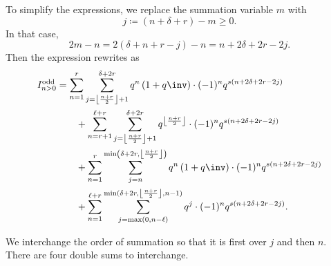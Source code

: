 To simplify the expressions, we replace the summation variable $m$ with
\[ j \coloneqq (n + \delta + r) - m \geq 0. \]
In that case,
\[ 2m-n = 2(\delta+n+r-j)-n = n + 2\delta + 2r - 2j. \]
Then the expression rewrites as
\begin{align*}
  I_{n > 0}^{\text{odd}}
  &= \sum_{n=1}^{r}
    \sum_{j = \left\lfloor \frac{n+r}{2} \right\rfloor+ 1}^{\delta + 2r}
    q^{n} \left( 1 + q\inv \right) \cdot (-1)^n q^{s(n+2\delta+2r-2j)} \\
  &\qquad+ \sum_{n=r+1}^{\ell+r}
    \sum_{j = \left\lfloor \frac{n+r}{2} \right\rfloor+ 1}^{\delta + 2r}
    q^{\left\lfloor \frac{n+r}{2} \right\rfloor} \cdot (-1)^n q^{s(n+2\delta+2r-2j)} \\
  &\qquad+ \sum_{n=1}^{r}
    \sum_{j=n}^{\min\left( \delta+2r, \left\lfloor \frac{n+r}{2} \right\rfloor \right)}
    q^{n} \left( 1 + q\inv \right) \cdot (-1)^n q^{s(n+2\delta+2r-2j)} \\
  &\qquad+ \sum_{n=1}^{\ell+r}
    \sum_{j=\max(0,n-\ell)}^{\min(\delta+2r, \left\lfloor \frac{n+r}{2} \right\rfloor, n-1)}
    q^{j} \cdot (-1)^n q^{s(n+2\delta+2r-2j)}.
\end{align*}

We interchange the order of summation so that it is first over $j$ and then $n$.
There are four double sums to interchange.

